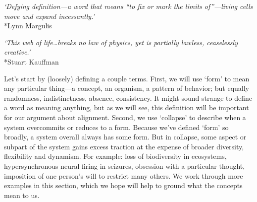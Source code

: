 \documentclass[11pt]{article}
\begin{document}
\begin{center}
\textit{`Defying definition---a word that means ``to fix or mark the limits of''---living cells move and expand incessantly.'}\\*Lynn Margulis
\end{center}

\begin{center}
\textit{`This web of life\ldots breaks no law of physics, yet is partially lawless, ceaselessly \\creative.'}\\*Stuart Kauffman
\end{center}



Let's start by (loosely) defining a couple terms. First, we will use `form' to mean any particular thing---a concept, an organism, a pattern of behavior; but equally randomness, indistinctness, absence, consistency. It might sound strange to define a word as meaning anything, but as we will see, this definition will be important for our argument about alignment. Second, we use `collapse' to describe when a system overcommits or reduces to a form. Because we've defined `form' so broadly, a system overall always has some form. But in collapse, some aspect or subpart of the system gains excess traction at the expense of broader diversity, flexibility and dynamism. For example: loss of biodiversity in ecosystems, hypersynchronous neural firing in seizures, obsession with a particular thought, imposition of one person's will to restrict many others. We work through more examples in this section, which we hope will help to ground what the concepts mean to us.
\end{document}

